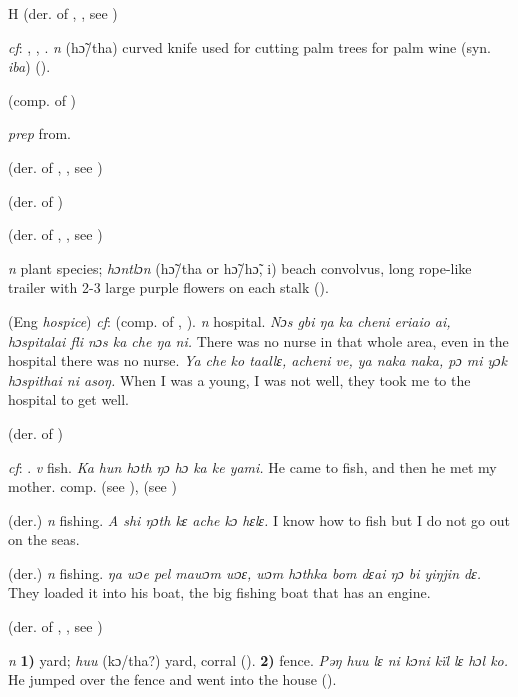 \begin{letter}{H}
 (der. of , , see ) 

 \textit{cf}: , , . \textit{n} (hɔ̃/tha) curved knife used for cutting palm trees for palm wine (syn. \textit{iba}) (\citealt{Pichl1967}). 

 (comp. of )

 \textit{prep} from.

 (der. of , , see ) 

 (der. of )

 (der. of , , see )

 \textit{n} plant species; \textit{hɔntlɔn} (hɔ̃/tha or hɔ̃/hɔ̃, i) beach convolvus, long rope-like trailer with 2-3 large purple flowers on each stalk (\citealt{Pichl1967}). 

 (Eng \textit{hospice}) \textit{cf}:  (comp. of , ). \textit{n} hospital. \textit{Nɔs gbi ŋa ka cheni eriaio ai, hɔspitalai fli nɔs ka che ŋa ni.} There was no nurse in that whole area, even in the hospital there was no nurse. \textit{Ya che ko taallɛ, acheni ve, ya naka naka, pɔ mi yɔk hɔspithai ni asoŋ.} When I was a young, I was not well, they took me to the hospital to get well.

 (der. of ) 

 \textit{cf}: . \textit{v} fish. \textit{Ka hun hɔth ŋɔ hɔ ka ke yami.} He came to fish, and then he met my mother. comp.  (see ),  (see ) 

 (der.) \textit{n} fishing. \textit{A shi ŋɔth kɛ ache kɔ hɛlɛ.} I know how to fish but I do not go out on the seas.

 (der.) \textit{n} fishing. \textit{ŋa wɔe pel mawɔm wɔɛ, wɔm hɔthka bom dɛai ŋɔ bi yiŋjin dɛ.} They loaded it into his boat, the big fishing boat that has an engine. 

 (der. of , , see ) 

 \textit{n} \textbf{1)} yard; \textit{huu} (kɔ/tha?) yard, corral (\citealt{Pichl1967}). \textbf{2)} fence. \textit{Pəŋ huu lɛ ni kɔni kïl lɛ hɔl ko.} He jumped over the fence and went into the house (\citealt{Pichl1967}). 


\end{letter}
